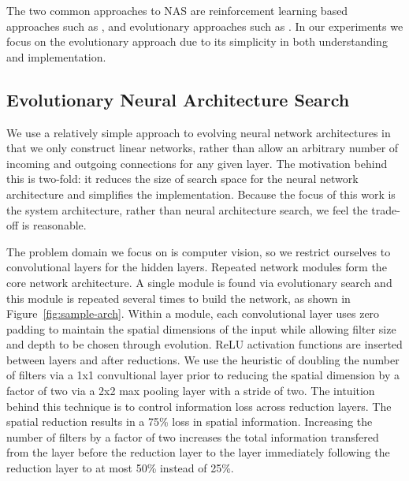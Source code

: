 \documentclass[conference]{IEEEtran}
\begin{document}
The two common approaches to NAS are reinforcement learning based approaches such
as \cite{45826, Kyriakides:2018:NAS:3200947.3208068, pmlr-v80-pham18a}, and
evolutionary approaches such as \cite{DBLP:journals/corr/abs-1711-00436,
  DBLP:journals/corr/MiikkulainenLMR17, DBLP:conf/icml/RealMSSSTLK17}. In our
experiments we focus on the evolutionary approach due to its simplicity in both
understanding and implementation.

\subsection{Evolutionary Neural Architecture Search}
We use a relatively simple approach to evolving neural network architectures in
that we only construct linear networks, rather than allow an arbitrary number of
incoming and outgoing connections for any given layer. The motivation behind
this is two-fold: it reduces the size of search space for the neural network
architecture and simplifies the implementation. Because the focus of this work
is the system architecture, rather than neural architecture search, we feel the
trade-off is reasonable.
% 

The problem domain we focus on is computer vision, so we restrict ourselves
to convolutional layers for the hidden layers. Repeated network modules
form the core network architecture. A single module is found via evolutionary
search and this module is repeated several times to build the network, as
shown in Figure~\ref{fig:sample-arch}.
Within a module, each convolutional layer uses zero padding to maintain the
spatial dimensions of the input while allowing filter size and depth to be
chosen through evolution. ReLU activation functions are inserted between
layers and after reductions.
We use the heuristic of doubling the number of filters
via a 1x1 convultional layer prior to reducing the spatial dimension by a
factor of two via a 2x2 max pooling layer with a stride of two.
The intuition behind this
technique is to control information loss across reduction layers. The spatial
reduction results in a 75\% loss in spatial information. Increasing the
number of filters by a factor of two increases the total information transfered
from the layer before the reduction layer to the layer immediately following
the reduction layer to at most 50\% instead of 25\%.
\end{document}
